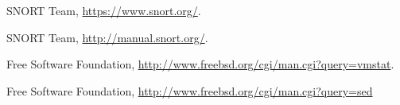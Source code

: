 \documentclass[10pt,a4paper]{article}
\begin{document}
    \begin{thebibliography}{9}

      SNORT Team,
      \url{https://www.snort.org/}.

      SNORT Team,
      \url{http://manual.snort.org/}.

      Free Software Foundation,
      \url{http://www.freebsd.org/cgi/man.cgi?query=vmstat}.

      Free Software Foundation,
      \url{http://www.freebsd.org/cgi/man.cgi?query=sed}
    \end{thebibliography}
\end{document}
